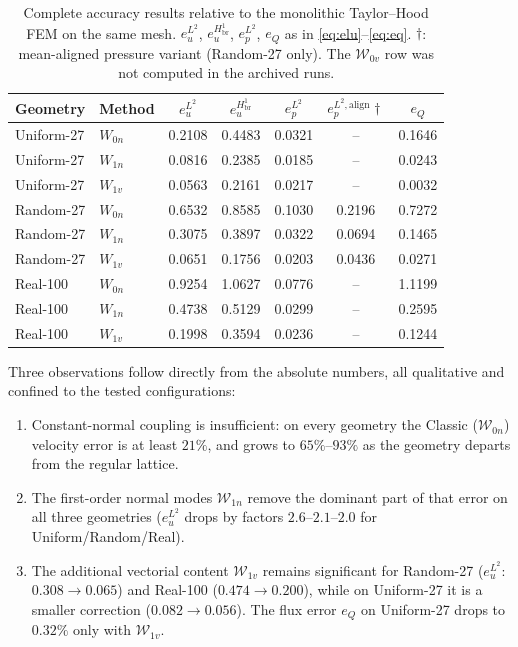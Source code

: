 \documentclass[11pt,a4paper]{article}
\newcommand{\Wspace}{\mathcal{W}}
\begin{document}
\begin{table}[t]
  \centering
  \small
  \caption{Complete accuracy results relative to the monolithic
    Taylor--Hood FEM on the same mesh.  $e_u^{L^2}$, $e_u^{H^1_{\mathrm{br}}}$,
    $e_p^{L^2}$, $e_Q$ as in \eqref{eq:elu}--\eqref{eq:eq}.
    $\dagger$: mean-aligned pressure variant (Random-27 only).  The
    $\Wspace_{0v}$ row was not computed in the archived runs.}
  \label{tab:master}
  \begin{tabular}{llccccc}
    \toprule
    Geometry & Method & $e_u^{L^2}$ & $e_u^{H^1_{\mathrm{br}}}$ &
    $e_p^{L^2}$ & $e_p^{L^2,\mathrm{align}}\dag$ & $e_Q$ \\
    \midrule
    Uniform-27 & $W_{0n}$ & 0.2108 & 0.4483 & 0.0321 & -- & 0.1646 \\
    Uniform-27 & $W_{1n}$ & 0.0816 & 0.2385 & 0.0185 & -- & 0.0243 \\
    Uniform-27 & $W_{1v}$ & 0.0563 & 0.2161 & 0.0217 & -- & 0.0032 \\
    \addlinespace[2pt]
    Random-27 & $W_{0n}$ & 0.6532 & 0.8585 & 0.1030 & 0.2196 & 0.7272 \\
    Random-27 & $W_{1n}$ & 0.3075 & 0.3897 & 0.0322 & 0.0694 & 0.1465 \\
    Random-27 & $W_{1v}$ & 0.0651 & 0.1756 & 0.0203 & 0.0436 & 0.0271 \\
    \addlinespace[2pt]
    Real-100 & $W_{0n}$ & 0.9254 & 1.0627 & 0.0776 & -- & 1.1199 \\
    Real-100 & $W_{1n}$ & 0.4738 & 0.5129 & 0.0299 & -- & 0.2595 \\
    Real-100 & $W_{1v}$ & 0.1998 & 0.3594 & 0.0236 & -- & 0.1244 \\
    \bottomrule
  \end{tabular}
\end{table}

Three observations follow directly from the absolute numbers, all
qualitative and confined to the tested configurations:

\begin{enumerate}[label=\textbf{(C\arabic*)}.,leftmargin=*,nosep]
\item Constant-normal coupling is insufficient: on every geometry the
  Classic ($\Wspace_{0n}$) velocity error is at least $21\%$, and grows
  to $65\%$--$93\%$ as the geometry departs from the regular lattice.
\item The first-order normal modes $\Wspace_{1n}$ remove the dominant
  part of that error on all three geometries ($e_u^{L^2}$ drops by
  factors $2.6$--$2.1$--$2.0$ for Uniform/Random/Real).
\item The additional vectorial content $\Wspace_{1v}$ remains
  significant for Random-27 ($e_u^{L^2}$: $0.308\to0.065$) and Real-100
  ($0.474\to0.200$), while on Uniform-27 it is a smaller correction
  ($0.082\to0.056$).  The flux error $e_Q$ on Uniform-27 drops to
  $0.32\%$ only with $\Wspace_{1v}$.
\end{enumerate}
\end{document}
